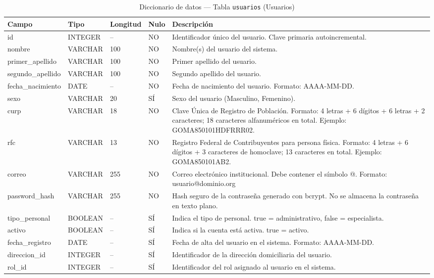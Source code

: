 \begin{table}[H]
	\centering
	\caption{Diccionario de datos --- Tabla \texttt{usuarios} (Usuarios)}
	\label{tab:data-dict-usuarios}
	\scriptsize
	\begin{tabular}{>{\ttfamily\raggedright\arraybackslash}p{3.6cm} p{1.6cm} p{1.3cm} p{0.7cm} p{5.6cm}}
		\toprule
		\textbf{Campo} & \textbf{Tipo} & \textbf{Longitud} & \textbf{Nulo} & \textbf{Descripción} \\
		\midrule
		id & INTEGER & -- & NO & Identificador único del usuario. Clave primaria autoincremental. \\
		nombre & VARCHAR & 100 & NO & Nombre(s) del usuario del sistema. \\
		primer\_apellido & VARCHAR & 100 & NO & Primer apellido del usuario. \\
		segundo\_apellido & VARCHAR & 100 & NO & Segundo apellido del usuario. \\
		fecha\_nacimiento & DATE & -- & NO & Fecha de nacimiento del usuario. Formato: AAAA-MM-DD. \\
		sexo & VARCHAR & 20 & SÍ & Sexo del usuario (Masculino, Femenino). \\
		curp & VARCHAR & 18 & NO & Clave Única de Registro de Población. Formato: 4 letras + 6 dígitos + 6 letras + 2 caracteres; 18 caracteres alfanuméricos en total. Ejemplo: GOMA850101HDFRRR02. \\
		rfc & VARCHAR & 13 & NO & Registro Federal de Contribuyentes para persona física. Formato: 4 letras + 6 dígitos + 3 caracteres de homoclave; 13 caracteres en total. Ejemplo: GOMA850101AB2. \\
		correo & VARCHAR & 255 & NO & Correo electrónico institucional. Debe contener el símbolo @. Formato: usuario@dominio.org \\
		password\_hash & VARCHAR & 255 & NO & Hash seguro de la contraseña generado con bcrypt. No se almacena la contraseña en texto plano. \\
		tipo\_personal & BOOLEAN & -- & SÍ & Indica el tipo de personal. true = administrativo, false = especialista. \\
		activo & BOOLEAN & -- & SÍ & Indica si la cuenta está activa. true = activo. \\
		fecha\_registro & DATE & -- & SÍ & Fecha de alta del usuario en el sistema. Formato: AAAA-MM-DD. \\
		direccion\_id & INTEGER & -- & SÍ & Identificador de la dirección domiciliaria del usuario. \\
		rol\_id & INTEGER & -- & SÍ & Identificador del rol asignado al usuario en el sistema. \\
		\bottomrule
	\end{tabular}
\end{table}

